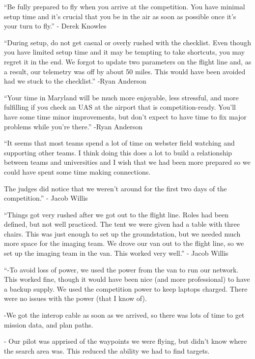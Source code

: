 {``Be fully prepared to fly when you arrive at the competition. You have
minimal setup time and it's crucial that you be in the air as soon as
possible once it's your turn to fly.'' - Derek Knowles}

{}

{``During setup, do not get casual or overly rushed with the checklist.
Even though you have limited setup time and it may be tempting to take
shortcuts, you may regret it in the end. We forgot to update two
parameters on the flight line and, as a result, our telemetry was off by
about 50 miles. This would have been avoided had we stuck to the
checklist.'' -Ryan Anderson}

{}

{``Your time in Maryland will be much more enjoyable, less stressful,
and more fulfilling if you check an UAS at the airport that is
competition-ready. You'll have some time minor improvements, but don't
expect to have time to fix major problems while you're there.'' -Ryan
Anderson}

{}

{``It seems that most teams spend a lot of time on webster field
watching and supporting other teams. I think doing this does a lot to
build a relationship between teams and universities and I wish that we
had been more prepared so we could have spent some time making
connections.}

{The judges did notice that we weren't around for the first two days of
the competition.'' - Jacob Willis}

{}

{``Things got very rushed after we got out to the flight line. Roles had
been defined, but not well practiced. The tent we were given had a table
with three chairs. This was just enough to set up the groundstation, but
we needed much more space for the imaging team. We drove our van out to
the flight line, so we set up the imaging team in the van. This worked
very well.'' - Jacob Willis}

{}

{``-To avoid loss of power, we used the power from the van to run our
network. This worked fine, though it would have been nice (and more
professional) to have a backup supply. We used the competition power to
keep laptops charged. There were no issues with the power (that I know
of).}

{-We got the interop cable as soon as we arrived, so there was lots of
time to get mission data, and plan paths.}

{- Our pilot was apprised of the waypoints we were flying, but didn't
know where the search area was. This reduced the ability we had to find
targets.}


